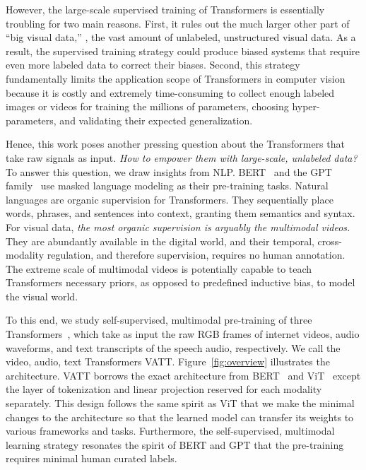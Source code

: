 \documentclass[10pt,twocolumn,letterpaper]{article}
\newcommand{\ours}{VATT\xspace}
\begin{document}
However, the large-scale supervised training of Transformers is essentially troubling for two main reasons. First, it rules out the much larger other part of ``big visual data,'' \ie, the vast amount of unlabeled, unstructured visual data. As a result, the supervised training strategy could produce biased systems that require even more labeled data to correct their biases. Second, this strategy fundamentally limits the application scope of Transformers in computer vision because it is costly and extremely time-consuming to collect enough labeled images or videos for training the millions of parameters, choosing hyper-parameters, and validating their expected generalization. 

Hence, this work poses another pressing question about the Transformers that take raw signals as input. \emph{How to empower them with large-scale, unlabeled data?} To answer this question, we draw insights from NLP. BERT~\cite{devlin2018bert} and the GPT family~\cite{radford2018improving, radford2019language, brown2020language}
use masked language modeling as their pre-training tasks. Natural languages are organic supervision for Transformers. They sequentially place words, phrases, and sentences into context, granting them semantics and syntax. For visual data, \emph{the most organic supervision is arguably the multimodal videos.}  They are abundantly available in the digital world, and their temporal, cross-modality regulation, and therefore supervision, requires no human annotation. The extreme scale of multimodal videos is potentially capable to teach Transformers necessary priors, as opposed to predefined inductive bias, to model the visual world.

To this end, we study self-supervised, multimodal pre-training of three Transformers~\cite{vaswani2017attention}, which take as input the raw RGB frames of internet videos, audio waveforms, and text transcripts of the speech audio, respectively. We call the video, audio, text Transformers \ours. Figure~\ref{fig:overview} illustrates the architecture. VATT borrows the exact architecture from BERT~\cite{devlin2018bert} and ViT~\cite{dosovitskiy2021an} except the layer of tokenization and linear projection reserved for each modality separately. This design follows the same spirit as ViT that we make the minimal changes to the architecture so that the learned model can transfer its weights to various frameworks and tasks. Furthermore, the self-supervised, multimodal learning strategy resonates the spirit of BERT and GPT that the pre-training requires minimal human curated labels. 
\end{document}
